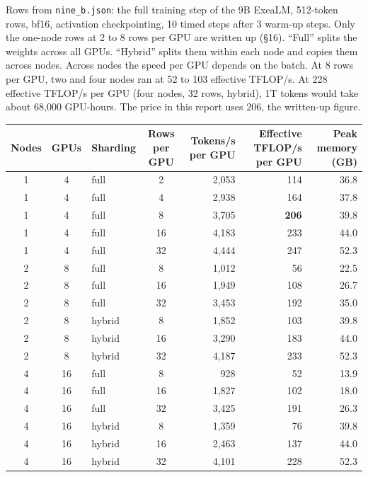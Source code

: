 \documentclass[11pt,letterpaper]{article}
\newcommand{\sect}[1]{\S#1}
\begin{document}
Rows from \texttt{nine\_b.json}: the full training step of the 9B ExeaLM, 512-token rows, bf16, activation checkpointing, 10 timed steps after 3 warm-up steps.
Only the one-node rows at 2 to 8 rows per GPU are written up (\sect{16}).
``Full'' splits the weights across all GPUs.
``Hybrid'' splits them within each node and copies them across nodes.
Across nodes the speed per GPU depends on the batch.
At 8 rows per GPU, two and four nodes ran at 52 to 103 effective TFLOP/s.
At 228 effective TFLOP/s per GPU (four nodes, 32 rows, hybrid), 1T tokens would take about 68,000 GPU-hours.
The price in this report uses 206, the written-up figure.

\begin{table}[H]
\centering\footnotesize
\begin{tabular}{@{}c c l c r r r@{}}
\toprule
Nodes & GPUs & Sharding & Rows per GPU & Tokens/s per GPU & Effective TFLOP/s per GPU & Peak memory (GB) \\
\midrule
1 & 4 & full & 2 & 2,053 & 114 & 36.8 \\
1 & 4 & full & 4 & 2,938 & 164 & 37.8 \\
1 & 4 & full & 8 & 3,705 & \textbf{206} & 39.8 \\
1 & 4 & full & 16 & 4,183 & 233 & 44.0 \\
1 & 4 & full & 32 & 4,444 & 247 & 52.3 \\
2 & 8 & full & 8 & 1,012 & 56 & 22.5 \\
2 & 8 & full & 16 & 1,949 & 108 & 26.7 \\
2 & 8 & full & 32 & 3,453 & 192 & 35.0 \\
2 & 8 & hybrid & 8 & 1,852 & 103 & 39.8 \\
2 & 8 & hybrid & 16 & 3,290 & 183 & 44.0 \\
2 & 8 & hybrid & 32 & 4,187 & 233 & 52.3 \\
4 & 16 & full & 8 & 928 & 52 & 13.9 \\
4 & 16 & full & 16 & 1,827 & 102 & 18.0 \\
4 & 16 & full & 32 & 3,425 & 191 & 26.3 \\
4 & 16 & hybrid & 8 & 1,359 & 76 & 39.8 \\
4 & 16 & hybrid & 16 & 2,463 & 137 & 44.0 \\
4 & 16 & hybrid & 32 & 4,101 & 228 & 52.3 \\
\bottomrule
\end{tabular}
\end{table}
\end{document}
